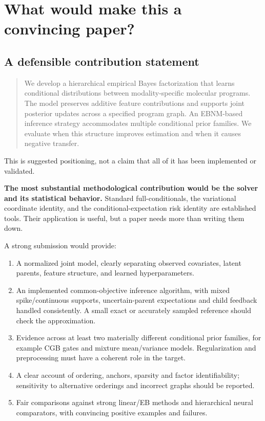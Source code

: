 \documentclass[11pt,a4paper]{article}
\numberwithin{equation}{section}
\begin{document}
\clearpage
\section{What would make this a convincing paper?}

\subsection*{A defensible contribution statement}
\begin{quote}
We develop a hierarchical empirical Bayes factorization that learns
conditional distributions between modality-specific molecular programs.
The model preserves additive feature contributions and supports joint
posterior updates across a specified program graph. An EBNM-based
inference strategy accommodates multiple conditional prior families.
We evaluate when this structure improves estimation and when it causes
negative transfer.
\end{quote}
This is suggested positioning, not a claim that all of it has been
implemented or validated.

\textbf{The most substantial methodological contribution would be the
solver and its statistical behavior.} Standard full-conditionals, the
variational coordinate identity, and the conditional-expectation risk
identity are established tools. Their application is useful, but a paper
needs more than writing them down.

A strong submission would provide:
\begin{enumerate}
\item A normalized joint model, clearly separating observed covariates,
latent parents, feature structure, and learned hyperparameters.
\item An implemented common-objective inference algorithm, with mixed
spike/continuous supports, uncertain-parent expectations and child
feedback handled consistently. A small exact or accurately sampled
reference should check the approximation.
\item Evidence across at least two materially different conditional
prior families, for example CGB gates and mixture mean/variance models.
Regularization and preprocessing must have a coherent role in the target.
\item A clear account of ordering, anchors, sparsity and factor
identifiability; sensitivity to alternative orderings and incorrect
graphs should be reported.
\item Fair comparisons against strong linear/EB methods and hierarchical
neural comparators, with convincing positive examples and failures.
\end{enumerate}
\end{document}
